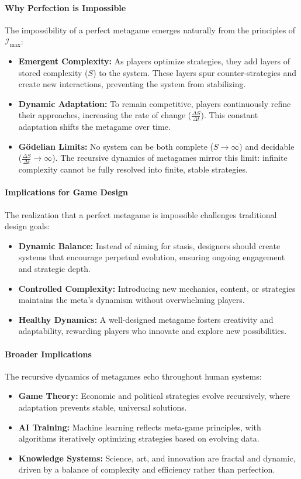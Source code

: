 \documentclass[12pt]{article}
\begin{document}
\paragraph{Why Perfection is Impossible}
The impossibility of a perfect metagame emerges naturally from the principles of \(\mathcal{I}_{\text{max}}\):
\begin{itemize}
    \item \textbf{Emergent Complexity:} As players optimize strategies, they add layers of stored complexity (\(S\)) to the system. These layers spur counter-strategies and create new interactions, preventing the system from stabilizing.
    \item \textbf{Dynamic Adaptation:} To remain competitive, players continuously refine their approaches, increasing the rate of change (\(\frac{\Delta S}{\Delta t}\)). This constant adaptation shifts the metagame over time.
    \item \textbf{Gödelian Limits:} No system can be both complete (\(S \to \infty\)) and decidable (\(\frac{\Delta S}{\Delta t} \to \infty\)). The recursive dynamics of metagames mirror this limit: infinite complexity cannot be fully resolved into finite, stable strategies.
\end{itemize}

\paragraph{Implications for Game Design}
The realization that a perfect metagame is impossible challenges traditional design goals:
\begin{itemize}
    \item \textbf{Dynamic Balance:} Instead of aiming for stasis, designers should create systems that encourage perpetual evolution, ensuring ongoing engagement and strategic depth.
    \item \textbf{Controlled Complexity:} Introducing new mechanics, content, or strategies maintains the meta’s dynamism without overwhelming players.
    \item \textbf{Healthy Dynamics:} A well-designed metagame fosters creativity and adaptability, rewarding players who innovate and explore new possibilities.
\end{itemize}

\paragraph{Broader Implications}
The recursive dynamics of metagames echo throughout human systems:
\begin{itemize}
    \item \textbf{Game Theory:} Economic and political strategies evolve recursively, where adaptation prevents stable, universal solutions.
    \item \textbf{AI Training:} Machine learning reflects meta-game principles, with algorithms iteratively optimizing strategies based on evolving data.
    \item \textbf{Knowledge Systems:} Science, art, and innovation are fractal and dynamic, driven by a balance of complexity and efficiency rather than perfection.
\end{itemize}
\end{document}
